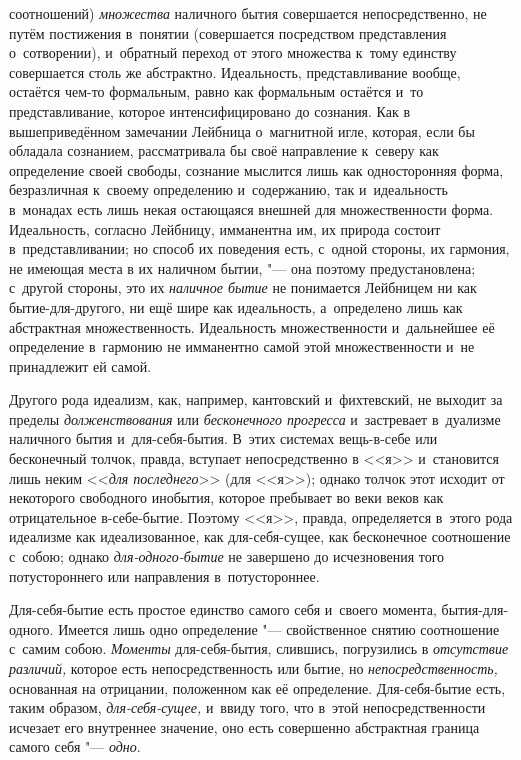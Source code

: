 соотношений) {\em множества} наличного бытия
совершается непосредственно, не путём постижения в~понятии (совершается
посредством представления о~сотворении), и~обратный переход от этого
множества к~тому единству совершается столь же абстрактно. Идеальность,
представливание вообще, остаётся чем-то формальным, равно как формальным
остаётся и~то представливание, которое интенсифицировано до сознания. Как в
вышеприведённом замечании Лейбница о~магнитной игле, которая, если
бы обладала сознанием, рассматривала бы своё направление к~северу как
определение своей свободы, сознание мыслится лишь как односторонняя форма,
безразличная к~своему определению и~содержанию, так и~идеальность в~монадах
есть лишь некая остающаяся внешней для множественности форма. Идеальность,
согласно Лейбницу, имманентна им, их природа состоит в~представливании; но
способ их поведения есть, с~одной стороны, их гармония, не имеющая места в
их наличном бытии, "--- она поэтому предустановлена; с~другой стороны, это их
{\em наличное бытие} не понимается Лейбницем ни как
бытие-для-другого, ни ещё шире как идеальность, а~определено лишь как
абстрактная множественность. Идеальность множественности и~дальнейшее её
определение в~гармонию не имманентно самой этой множественности и~не
принадлежит ей самой.

Другого рода идеализм, как, например, кантовский и~фихтевский, не выходит за
пределы {\em долженствования} или
{\em бесконечного прогресса} и~застревает в~дуализме
наличного бытия и~для-себя-бытия. В~этих системах вещь-в-себе или
бесконечный толчок, правда, вступает непосредственно в <<я>> и~становится
лишь неким <<{\em для последнего}>> (для <<я>>); однако
толчок этот исходит от некоторого свободного инобытия, которое пребывает во
веки веков как отрицательное в-себе-бытие. Поэтому <<я>>, правда,
определяется в~этого рода идеализме как идеализованное, как для-себя-сущее,
как бесконечное соотношение с~собою; однако
{\em для-одного-бытие} не завершено до исчезновения
того потустороннего или направления в~потустороннее.


Для-себя-бытие есть простое единство самого себя и~своего момента,
бытия-для-одного. Имеется лишь одно определение "--- свойственное снятию
соотношение с~самим собою. {\em Моменты}
для-себя-бытия, слившись, погрузились в {\em отсутствие
различий,} которое есть непосредственность или бытие, но
{\em непосредственность,} основанная на отрицании,
положенном как её определение. Для-себя-бытие есть, таким образом,
{\em для-себя-сущее,} и~ввиду того, что в~этой
непосредственности исчезает его внутреннее значение, оно есть совершенно
абстрактная граница самого себя "--- {\em одно}.

